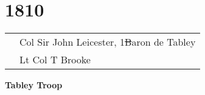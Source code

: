 \chapter*{1810}

\vspace*{10mm}

\begin{center}
  \begin{tabular}{rl}
    & Col Sir John Leicester, 1\st Baron de Tabley \\
    & Lt Col T Brooke \\
  \end{tabular}
\end{center}

\vspace*{10mm}

\begin{center}
  \Large
  \textbf{Tabley Troop}
\end{center}

\vspace*{10mm}

